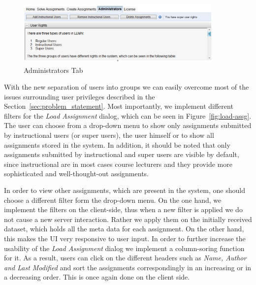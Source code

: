 \begin{figure}[h]
	\begin{center}
		\includegraphics[width=0.9\textwidth]{./img/admin-ui.png}
		\caption{Administrators Tab}
		\label{fig:admin-ui}
	\end{center}
\end{figure}

With the new separation of users into groups we can easily overcome most of 
the issues surrounding user privileges described in the Section~\ref{sec:problem_statement}.
Most importantly, we implement different filters for the \emph{Load Assignment} dialog,
which can be seen in Figure~\ref{fig:load-assg}. The user can choose from 
a drop-down menu to show only assignments submitted by instructional users 
(or super users), the user himself or to show all assignments stored in the system. 
In addition, it should be noted that only assignments submitted
by instructional and super users are visible by default, since instructional are in most
cases course lecturers and they provide more sophisticated and 
well-thought-out assignments. 

In order to view other assignments, which are present in the system, 
one should choose a different filter form the drop-down menu. 
On the one hand, we implement the filters on the client-side, thus when a new filter is
applied we do not cause a new server interaction. Rather we apply them
on the initially received dataset, which holds all the meta data for each assignment.
On the other hand, this makes the UI very responsive to user input. 
In order to further increase the usability of the \emph{Load Assignment} dialog
we implement a column-soring function for it. As a result, users can click on
the different headers such as \emph{Name, Author and Last Modified} and sort the 
assignments correspondingly in an increasing or in a decreasing order. This is once
again done on the client side. 

